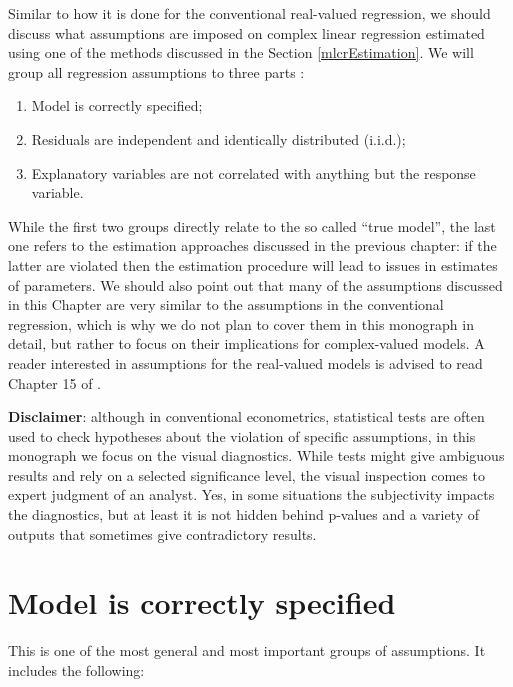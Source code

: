 \documentclass[
]{book}
\providecommand{\tightlist}{%
  \setlength{\itemsep}{0pt}\setlength{\parskip}{0pt}}
\begin{document}
Similar to how it is done for the conventional real-valued regression, we should discuss what assumptions are imposed on complex linear regression estimated using one of the methods discussed in the Section \ref{mlcrEstimation}. We will group all regression assumptions to three parts \citep[similar to how it was done by][]{SvetunkovAdam}:

\begin{enumerate}
\def\labelenumi{\arabic{enumi}.}
\tightlist
\item
  Model is correctly specified;
\item
  Residuals are independent and identically distributed (i.i.d.);
\item
  Explanatory variables are not correlated with anything but the response variable.
\end{enumerate}

While the first two groups directly relate to the so called ``true model'', the last one refers to the estimation approaches discussed in the previous chapter: if the latter are violated then the estimation procedure will lead to issues in estimates of parameters. We should also point out that many of the assumptions discussed in this Chapter are very similar to the assumptions in the conventional regression, which is why we do not plan to cover them in this monograph in detail, but rather to focus on their implications for complex-valued models. A reader interested in assumptions for the real-valued models is advised to read Chapter 15 of \citet{SvetunkovSBA}.

\textbf{Disclaimer}: although in conventional econometrics, statistical tests are often used to check hypotheses about the violation of specific assumptions, in this monograph we focus on the visual diagnostics. While tests might give ambiguous results and rely on a selected significance level, the visual inspection comes to expert judgment of an analyst. Yes, in some situations the subjectivity impacts the diagnostics, but at least it is not hidden behind p-values and a variety of outputs that sometimes give contradictory results.

\hypertarget{assumptionsSpecification}{%
\section{Model is correctly specified}\label{assumptionsSpecification}}

This is one of the most general and most important groups of assumptions. It includes the following:
\end{document}
